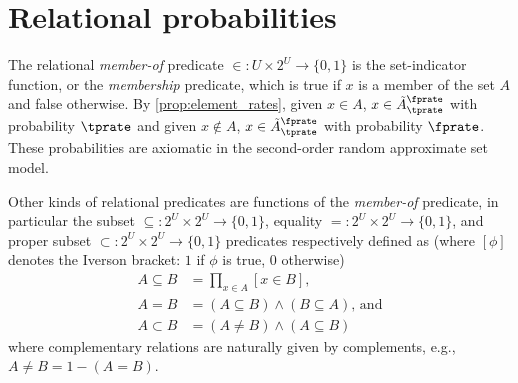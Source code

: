 \section{Relational probabilities}
\label{sec:relational}
The relational \emph{member-of} predicate $\in : U \times 2^U \to \{0,1\}$ is the set-indicator function, or the \emph{membership} predicate, which is true if $x$ is a member of the set $A$ and false otherwise.
By \cref{prop:element_rates}, given $x \in A$, $x \in \tilde{A}^\fprate_\tprate$ with probability $\tprate$ and given $x \notin A$, $x \in \tilde{A}^\fprate_\tprate$ with probability $\fprate$.
These probabilities are axiomatic in the second-order random approximate set model.

Other kinds of relational predicates are functions of the \emph{member-of} predicate, in particular the subset $\subseteq : 2^U \times 2^U \to \{0,1\}$, equality $= : 2^U \times 2^U \to \{0,1\}$, and
proper subset $\subset : 2^U \times 2^U \to \{0,1\}$ predicates respectively defined as (where $[\phi]$ denotes the Iverson bracket: $1$ if $\phi$ is true, $0$ otherwise)
\begin{align}
\label{def:subset_pred}
A \subseteq B	&= \prod_{x \in A} [x \in B],\\
\label{def:eq_pred}
A = B			&= (A\subseteq B) \land (B\subseteq A) \text{, and}\\
\label{def:proper_subset_pred}
A \subset B		&= (A \neq B) \land (A \subseteq B)
\end{align}
where complementary relations are naturally given by complements, e.g., $A \neq B = 1-(A = B)$.

